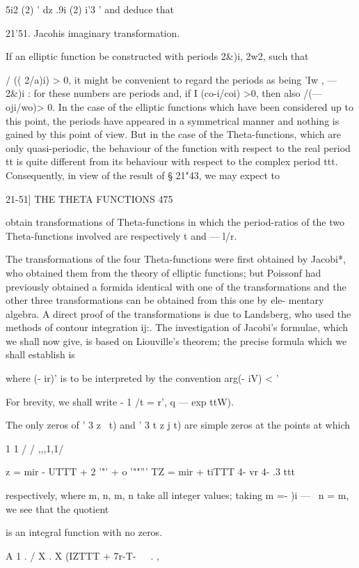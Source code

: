 5i2 (2) ' dz .9i (2) i'3 ' and deduce that

21'51. Jacohis imaginary transformation.

If an elliptic function be constructed with periods 2\&)i, 2w2, such
that

/ (( 2/a)i) > 0, it might be convenient to regard the periods as being
'Iw , — 2\&)i : for these numbers are periods and, if I (co-i/coi) >0,
then also /(— oji/wo)> 0. In the case of the elliptic functions which
have been considered up to this point, the periods have appeared in a
symmetrical manner and nothing is gained by this point of view. But in
the case of the Theta-functions, which are only quasi-periodic, the
behaviour of the function with respect to the real period tt is quite
different from its behaviour with respect to the complex period ttt.
Consequently, in view of the result of § 21"43, we may expect to

21-51] THE THETA FUNCTIONS 475

obtain transformations of Theta-functions in which the period-ratios
of the two Theta-functions involved are respectively t and — l/r.

The transformations of the four Theta-functions were first obtained by
Jacobi*, who obtained them from the theory of elliptic functions; but
Poissonf had previously obtained a formida identical with one of the
transformations and the other three transformations can be obtained
from this one by ele- mentary algebra. A direct proof of the
transformations is due to Landsberg, who used the methods of contour
integration ij:. The investigation of Jacobi's formulae, which we
shall now give, is based on Liouville's theorem; the precise formula
which we shall establish is

where (- ir)' is to be interpreted by the convention arg(- iV) < '

For brevity, we shall write - 1 /t = r', q — exp ttW).

The only zeros of ' 3 z \ t) and ' 3 t z j t) are simple zeros at the
points at which

1 1 / / ,,,1,1/

z = mir - UTTT + 2 '"' + o '""''' TZ = mir + tiTTT 4- vr 4- .3 ttt

respectively, where m, n, m, n take all integer values; taking m =- )i
— \, n = m, we see that the quotient

is an integral function with no zeros.

A 1 . / X . X (IZTTT + 7r-T-\ \ \ . ,

